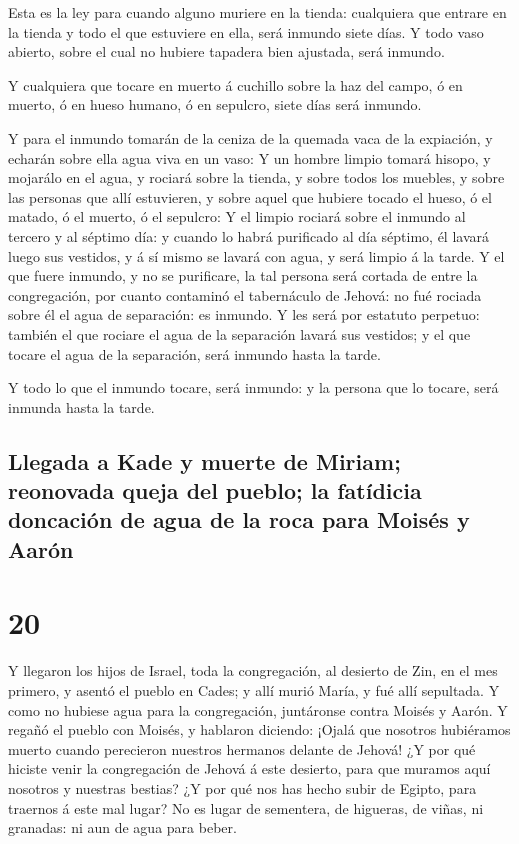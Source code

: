  Esta es la ley para cuando alguno muriere en la tienda:
cualquiera que entrare en la tienda y todo el que estuviere en ella,
será inmundo siete días.  Y todo vaso abierto, sobre el
cual no hubiere tapadera bien ajustada, será inmundo.

 Y cualquiera que tocare en muerto á cuchillo sobre la haz
del campo, ó en muerto, ó en hueso humano, ó en sepulcro, siete días
será inmundo.

 Y para el inmundo tomarán de la ceniza de la quemada vaca
de la expiación, y echarán sobre ella agua viva en un vaso:
 Y un hombre limpio tomará hisopo, y mojarálo en el agua, y
rociará sobre la tienda, y sobre todos los muebles, y sobre las personas
que allí estuvieren, y sobre aquel que hubiere tocado el hueso, ó el
matado, ó el muerto, ó el sepulcro:  Y el limpio rociará
sobre el inmundo al tercero y al séptimo día: y cuando lo habrá
purificado al día séptimo, él lavará luego sus vestidos, y á sí mismo se
lavará con agua, y será limpio á la tarde.  Y el que fuere
inmundo, y no se purificare, la tal persona será cortada de entre la
congregación, por cuanto contaminó el tabernáculo de Jehová: no fué
rociada sobre él el agua de separación: es inmundo.  Y les
será por estatuto perpetuo: también el que rociare el agua de la
separación lavará sus vestidos; y el que tocare el agua de la
separación, será inmundo hasta la tarde.

 Y todo lo que el inmundo tocare, será inmundo: y la
persona que lo tocare, será inmunda hasta la tarde.

\hypertarget{llegada-a-kade-y-muerte-de-miriam-reonovada-queja-del-pueblo-la-fatuxeddicia-doncaciuxf3n-de-agua-de-la-roca-para-moisuxe9s-y-aaruxf3n}{%
\subsection{Llegada a Kade y muerte de Miriam; reonovada queja del
pueblo; la fatídicia doncación de agua de la roca para Moisés y
Aarón}\label{llegada-a-kade-y-muerte-de-miriam-reonovada-queja-del-pueblo-la-fatuxeddicia-doncaciuxf3n-de-agua-de-la-roca-para-moisuxe9s-y-aaruxf3n}}

\hypertarget{section-19}{%
\section{20}\label{section-19}}

 Y llegaron los hijos de Israel, toda la congregación, al
desierto de Zin, en el mes primero, y asentó el pueblo en Cades; y allí
murió María, y fué allí sepultada.  Y como no hubiese agua
para la congregación, juntáronse contra Moisés y Aarón.  Y
regañó el pueblo con Moisés, y hablaron diciendo: ¡Ojalá que nosotros
hubiéramos muerto cuando perecieron nuestros hermanos delante de Jehová!
 ¿Y por qué hiciste venir la congregación de Jehová á este
desierto, para que muramos aquí nosotros y nuestras bestias?
 ¿Y por qué nos has hecho subir de Egipto, para traernos á
este mal lugar? No es lugar de sementera, de higueras, de viñas, ni
granadas: ni aun de agua para beber.

